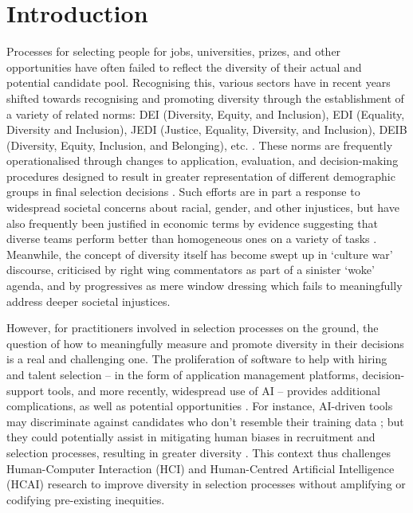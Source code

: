 \section{Introduction}\label{sec:divintro}
Processes for selecting people for jobs, universities, prizes, and other opportunities have often failed to reflect the diversity of their actual and potential candidate pool. Recognising this, various sectors have in recent years shifted towards recognising and promoting diversity through the establishment of a variety of related norms: DEI (Diversity, Equity, and Inclusion), EDI (Equality, Diversity and Inclusion), JEDI (Justice, Equality, Diversity, and Inclusion), DEIB (Diversity, Equity, Inclusion, and Belonging), etc. \cite{pinkett2023data,hsieh2019allocation,minkin2023diversity}. These norms are frequently operationalised through changes to application, evaluation, and decision-making procedures designed to result in greater representation of different demographic groups in final selection decisions \cite{pinkett2023data}. Such efforts are in part a response to widespread societal concerns about racial, gender, and other injustices, but have also frequently been justified in economic terms by evidence suggesting that diverse teams perform better than homogeneous ones on a variety of tasks \cite{deming2017growing,page_diversity_2017,noray2023systemic}. Meanwhile, the concept of diversity itself has become swept up in `culture war' discourse, criticised by right wing commentators as part of a sinister `woke' agenda, and by progressives as mere window dressing which fails to meaningfully address deeper societal injustices. 

However, for practitioners involved in selection processes on the ground, the question of how to meaningfully measure and promote diversity in their decisions is a real and challenging one. The proliferation of software to help with hiring and talent selection – in the form of application management platforms, decision-support tools, and more recently, widespread use of AI – provides additional complications, as well as potential opportunities \cite{Lashkari_Cheng_2023}. For instance, AI-driven tools may discriminate against candidates who don't resemble their training data \cite{chen2018investigating,li2020hiring,lambrecht2019algorithmic}; but they could potentially assist in mitigating human biases in recruitment and selection processes, resulting in greater diversity \cite{yarger2020algorithmic,avery2024does,will2023people, suhr2021does}. This context thus challenges Human-Computer Interaction (HCI) and Human-Centred Artificial Intelligence (HCAI) research to improve diversity in selection processes without amplifying or codifying pre-existing inequities.

